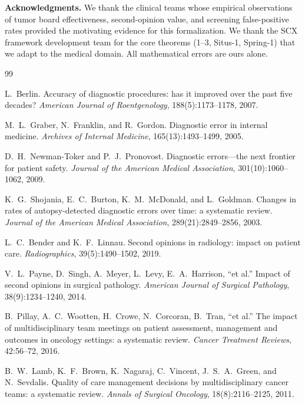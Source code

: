 \documentclass[11pt,a4paper]{article}
\theoremstyle{definition}
\newcommand{\SCX}{\textsc{SCX}}
\begin{document}
\medskip
\noindent\textbf{Acknowledgments.} We thank the clinical teams whose
empirical observations of tumor board effectiveness, second-opinion value,
and screening false-positive rates provided the motivating evidence for
this formalization. We thank the \SCX{} framework development team for
the core theorems (1--3, Situs-1, Spring-1) that we adapt to the medical
domain. All mathematical errors are ours alone.

\begin{thebibliography}{99}

L.~Berlin.
Accuracy of diagnostic procedures: has it improved over the past five decades?
\textit{American Journal of Roentgenology}, 188(5):1173--1178, 2007.

M.~L.~Graber, N.~Franklin, and R.~Gordon.
Diagnostic error in internal medicine.
\textit{Archives of Internal Medicine}, 165(13):1493--1499, 2005.

D.~H.~Newman-Toker and P.~J.~Pronovost.
Diagnostic errors---the next frontier for patient safety.
\textit{Journal of the American Medical Association}, 301(10):1060--1062, 2009.

K.~G.~Shojania, E.~C.~Burton, K.~M.~McDonald, and L.~Goldman.
Changes in rates of autopsy-detected diagnostic errors over time: a systematic review.
\textit{Journal of the American Medical Association}, 289(21):2849--2856, 2003.

L.~C.~Bender and K.~F.~Linnau.
Second opinions in radiology: impact on patient care.
\textit{Radiographics}, 39(5):1490--1502, 2019.

V.~L.~Payne, D.~Singh, A.~Meyer, L.~Levy, E.~A.~Harrison, ``et al.''
Impact of second opinions in surgical pathology.
\textit{American Journal of Surgical Pathology}, 38(9):1234--1240, 2014.

B.~Pillay, A.~C.~Wootten, H.~Crowe, N.~Corcoran, B.~Tran, ``et al.''
The impact of multidisciplinary team meetings on patient assessment,
management and outcomes in oncology settings: a systematic review.
\textit{Cancer Treatment Reviews}, 42:56--72, 2016.

B.~W.~Lamb, K.~F.~Brown, K.~Nagaraj, C.~Vincent, J.~S.~A.~Green, and N.~Sevdalis.
Quality of care management decisions by multidisciplinary cancer teams:
a systematic review.
\textit{Annals of Surgical Oncology}, 18(8):2116--2125, 2011.


\end{thebibliography}
\end{document}
